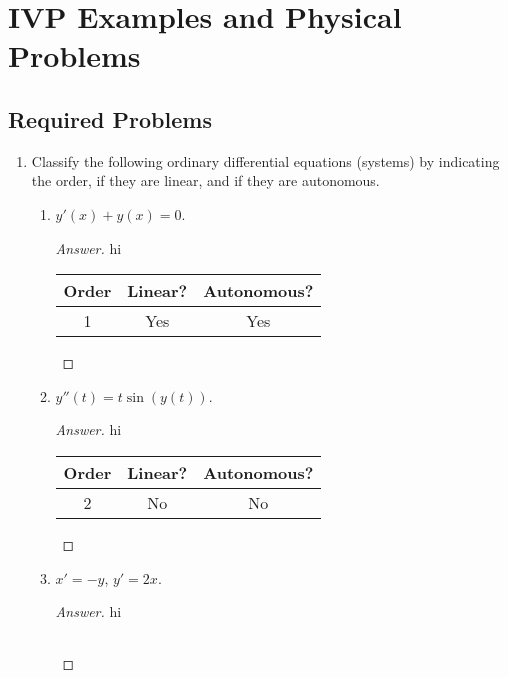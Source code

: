 \documentclass[../psets.tex]{subfiles}
\begin{document}
\section{IVP Examples and Physical Problems}
\subsection*{Required Problems}
\begin{enumerate}
    \item {}Classify the following ordinary differential equations (systems) by indicating the order, if they are linear, and if they are autonomous.
    \begin{enumerate}
        \item $y'(x)+y(x)=0$.
        \begin{proof}[Answer]
            {\color{white}hi}
            \begin{center}
                \small
                \renewcommand{\arraystretch}{1.2}
                \begin{tabular}{c|c|c}
                    Order & Linear? & Autonomous?\\
                    \hline
                    1 & Yes & Yes\\
                \end{tabular}
            \end{center}
        \end{proof}
        \item $y''(t)=t\sin(y(t))$.
        \begin{proof}[Answer]
            {\color{white}hi}
            \begin{center}
                \small
                \renewcommand{\arraystretch}{1.2}
                \begin{tabular}{c|c|c}
                    Order & Linear? & Autonomous?\\
                    \hline
                    2 & No & No\\
                \end{tabular}
            \end{center}
        \end{proof}
        \item $x'=-y$, $y'=2x$.
        \begin{proof}[Answer]
            {\color{white}hi}
            \begin{center}
                \small
                \renewcommand{\arraystretch}{1.2}
                \begin{tabular}{c|c|c}

\end{tabular}
\end{center}
\end{proof}
\end{enumerate}
\end{enumerate}
\end{document}
